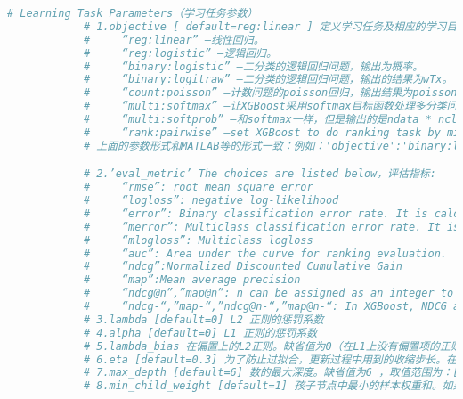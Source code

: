 \begin{lstlisting}[language = Python]
            # Learning Task Parameters（学习任务参数）
            # 1.objective [ default=reg:linear ] 定义学习任务及相应的学习目标，可选的目标函数如下：
            #     “reg:linear” –线性回归。
            #     “reg:logistic” –逻辑回归。
            #     “binary:logistic” –二分类的逻辑回归问题，输出为概率。
            #     “binary:logitraw” –二分类的逻辑回归问题，输出的结果为wTx。
            #     “count:poisson” –计数问题的poisson回归，输出结果为poisson分布。 在poisson回归中，max_delta_step的缺省值为0.7。(used to safeguard optimization)
            #     “multi:softmax” –让XGBoost采用softmax目标函数处理多分类问题，同时需要设置参数num_class（类别个数）
            #     “multi:softprob” –和softmax一样，但是输出的是ndata * nclass的向量，可以将该向量reshape成ndata行nclass列的矩阵。没行数据表示样本所属于每个类别的概率。
            #     “rank:pairwise” –set XGBoost to do ranking task by minimizing the pairwise loss
            # 上面的参数形式和MATLAB等的形式一致：例如：'objective':'binary:logistic' 表示因变量 y 是二分类变量，用的回归函数是logistics回归。

            # 2.’eval_metric’ The choices are listed below，评估指标:
            #     “rmse”: root mean square error
            #     “logloss”: negative log-likelihood
            #     “error”: Binary classification error rate. It is calculated as #(wrong cases)/#(all cases). For the predictions, the evaluation will regard the instances with prediction value larger than 0.5 as positive instances, and the others as negative instances.
            #     “merror”: Multiclass classification error rate. It is calculated as #(wrong cases)/#(all cases).
            #     “mlogloss”: Multiclass logloss
            #     “auc”: Area under the curve for ranking evaluation.
            #     “ndcg”:Normalized Discounted Cumulative Gain
            #     “map”:Mean average precision
            #     “ndcg@n”,”map@n”: n can be assigned as an integer to cut off the top positions in the lists for evaluation.
            #     “ndcg-“,”map-“,”ndcg@n-“,”map@n-“: In XGBoost, NDCG and MAP will evaluate the score of a list without any positive samples as 1. By adding “-” in the evaluation metric XGBoost will evaluate these score as 0 to be consistent under some conditions.
            # 3.lambda [default=0] L2 正则的惩罚系数
            # 4.alpha [default=0] L1 正则的惩罚系数
            # 5.lambda_bias 在偏置上的L2正则。缺省值为0（在L1上没有偏置项的正则，因为L1时偏置不重要）
            # 6.eta [default=0.3] 为了防止过拟合，更新过程中用到的收缩步长。在每次提升计算之后，算法会直接获得新特征的权重。 eta通过缩减特征的权重使提升计算过程更加保守。缺省值为0.3, 取值范围为：[0,1]
            # 7.max_depth [default=6] 数的最大深度。缺省值为6 ，取值范围为：[1,inf]
            # 8.min_child_weight [default=1] 孩子节点中最小的样本权重和。如果一个叶子节点的样本权重和小于min_child_weight则拆分过程结束。在现行回归模型中，这个参数是指建立每个模型所需要的最小样本数。该成熟越大算法越conservative, 取值范围为: [0,inf].


\end{lstlisting}
